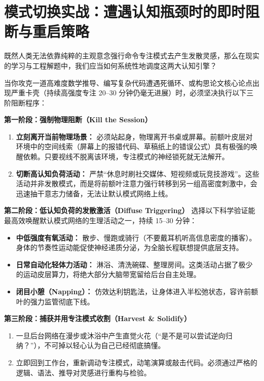 \documentclass[12pt,a4paper,openany]{ctexbook}
\begin{document}
\section{模式切换实战：遭遇认知瓶颈时的即时阻断与重启策略}

既然人类无法依靠纯粹的主观意念强行命令专注模式去产生发散灵感，那么在现实的学习与工程解题中，我们应当如何系统性地调度这两大认知引擎？

\begin{practicebox}
当你攻克一道高难度数学推导、编写复杂代码遭遇死循环、或构思论文核心论点出现严重卡壳（持续高强度专注 20--30 分钟仍毫无进展）时，必须坚决执行以下三阶阻断程序：

\textbf{第一阶段：强制物理阻断（Kill the Session）}
\begin{enumerate}
    \item \textbf{立刻离开当前物理场景：} 必须站起身，物理离开书桌或屏幕。前额叶皮层对环境中的空间线索（屏幕上的报错代码、草稿纸上的错误公式）具有极强的唤醒依赖。只要视线不脱离该环境，专注模式的神经锁死就无法解开。
    \item \textbf{切断高认知负荷活动：} 严禁“休息时刷社交媒体、短视频或玩竞技游戏”。这些活动并非发散模式，而是将前额叶注意力强行转移到另一组高密度刺激中，会迅速抽干意志力储备，无法让默认模式网络上线。
\end{enumerate}

\textbf{第二阶段：低认知负荷的发散激活（Diffuse Triggering）}
选择以下科学验证能最高效唤醒默认模式网络的生理活动之一，持续 15--30 分钟：
\begin{itemize}
    \item \textbf{中低强度有氧活动：} 散步、慢跑或骑行（不要戴耳机听高信息密度的播客）。身体的节奏性运动能促使神经递质分泌，为全脑长程联想提供底层支持。
    \item \textbf{日常自动化轻体力活动：} 淋浴、清洗碗碟、整理房间。这类活动占据了极少的运动皮层算力，将绝大部分大脑带宽留给后台自主处理。
    \item \textbf{闭目小憩（Napping）：} 仿效达利钥匙法，让身体进入半松弛状态，容许前额叶的强力监管彻底下线。
\end{itemize}

\textbf{第三阶段：捕获并用专注模式收割（Harvest \& Solidify）}
\begin{enumerate}
    \item 一旦后台网络在漫步或沐浴中产生直觉火花（“是不是可以尝试逆向归纳？”），不可掉以轻心认为自己已经彻底搞懂。
    \item 立即回到工作台，重新调动专注模式，动笔演算或敲击代码。必须通过严格的逻辑、语法、推导对灵感进行重构与检验。
\end{enumerate}
\end{practicebox}
\end{document}

